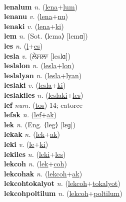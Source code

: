  \label{lenalon} \\
\textbf{lenalum} \textit{n.} (\hyperref[lena]{lena}+\hyperref[lum]{lum})
 \label{lenalum} \\
\textbf{lenanu} \textit{v.} (\hyperref[lena]{lena}+\hyperref[nu]{nu})
 \label{lenanu} \\
\textbf{lenaki} \textit{v.} (\hyperref[lena]{lena}+\hyperref[ki]{ki})
 \label{lenaki} \\
\textbf{lem} \textit{n.} (Sot. ⟨lema⟩ [lemɑ])
 \label{lem} \\
\textbf{les} \textit{n.} (\hyperref[l]{l}+\hyperref[es]{es})
 \label{les} \\
\textbf{lesla} \textit{v.} ({\gurmukhi{}ਲੇਸਲਾ} [leslɑ])
 \label{lesla} \\
\textbf{leslalon} \textit{n.} (\hyperref[lesla]{lesla}+\hyperref[lon]{lon})
 \label{leslalon} \\
\textbf{leslalyan} \textit{n.} (\hyperref[lesla]{lesla}+\hyperref[lyan]{lyan})
 \label{leslalyan} \\
\textbf{leslaki} \textit{v.} (\hyperref[lesla]{lesla}+\hyperref[ki]{ki})
 \label{leslaki} \\
\textbf{leslakiles} \textit{n.} (\hyperref[leslaki]{leslaki}+\hyperref[les]{les})
 \label{leslakiles} \\
\textbf{lef} \textit{num.} (\hyperref[tos]{\sout{tos}})
14; catorce \label{lef} \\
\textbf{lefak} \textit{n.} (\hyperref[lef]{lef}+\hyperref[ak]{ak})
 \label{lefak} \\
\textbf{lek} \textit{n.} (Eng. ⟨leg⟩ [lɛɡ])
 \label{lek} \\
\textbf{lekak} \textit{n.} (\hyperref[lek]{lek}+\hyperref[ak]{ak})
 \label{lekak} \\
\textbf{leki} \textit{v.} (\hyperref[le]{le}+\hyperref[ki]{ki})
 \label{leki} \\
\textbf{lekiles} \textit{n.} (\hyperref[leki]{leki}+\hyperref[les]{les})
 \label{lekiles} \\
\textbf{lekcoh} \textit{n.} (\hyperref[lek]{lek}+\hyperref[coh]{coh})
 \label{lekcoh} \\
\textbf{lekcohak} \textit{n.} (\hyperref[lekcoh]{lekcoh}+\hyperref[ak]{ak})
 \label{lekcohak} \\
\textbf{lekcohtokalyot} \textit{n.} (\hyperref[lekcoh]{lekcoh}+\hyperref[tokalyot]{tokalyot})
 \label{lekcohtokalyot} \\
\textbf{lekcohpoltilum} \textit{n.} (\hyperref[lekcoh]{lekcoh}+\hyperref[poltilum]{poltilum})
 \label{lekcohpoltilum} \\
